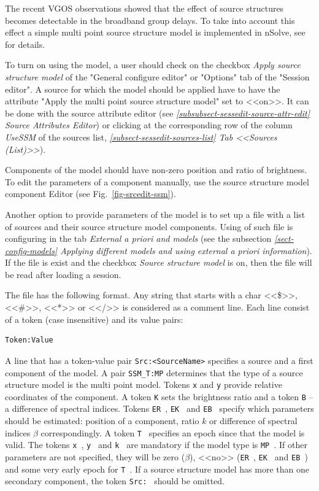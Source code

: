 \documentclass [10pt,letterpaper]{report}
\newcommand{\nuSolve}{\greektext n\latintext Solve}
\begin{document}
The recent VGOS observations showed that the effect of source structures becomes
detectable in the broadband group delays. To take into account this effect
a simple multi point source structure model is implemented in \nuSolve{}, see
\cite{Bolotin2019} for details.

To turn on using the model, a user should check on the checkbox {\sl Apply source
structure model} of the "General configure editor" or "Options" tab of the
"Session editor". A source for which the model should be applied have to have
the attribute "Apply the multi point source structure model" set to <<on>>.
It can be done with the source attribute editor (see
\emph{\ref{subsubsect-sessedit-source-attr-edit} Source Attributes Editor}) or
clicking at the corresponding row of the column {\sl UseSSM} of the sources list,
\emph{\ref{subsect-sessedit-sources-list} Tab <<Sources (List)>>}).

Components of the model should have non-zero position and ratio of brightness.
To edit the parameters of a component manually, use the source structure model
component Editor (see Fig.~\ref{fig-srcedit-ssm}).

Another option to provide parameters of the model is to set up a file with a
list of sources and their source structure model components. Using of such file
is configuring in the tab {\sl External a priori and models}
(see the subsection \emph{\ref{sect-config-models} Applying different models
and using external a priori information}). If the file is exist and the checkbox
{\sl Source structure model} is on, then the file will be read after loading a
session.

The file has the following format. Any string that starts with a char <<\$>>,
<<\#>>, <<*>> or <</>> is considered as a comment line. Each line consist of
a token (case insensitive) and its value pairs:
\begin{verbatim}
Token:Value
\end{verbatim}
\noindent
A line that has a token-value pair {\tt Src:<SourceName>} specifies a source
and a first component of the model. A pair {\tt SSM\_T:MP} determines that the type
of a source structure model is the multi point model. Tokens {\tt x} and {\tt y} provide
relative coordinates of the component. A token {\tt K} sets the brightness ratio
and a token {\tt B} -- a difference of spectral indices. Tokens
{\tt ER }, {\tt EK } and {\tt EB } specify which parameters should be estimated:
position of a component, ratio $k$ or difference of spectral indices $\beta$ correspondingly.
A token {\tt T } specifies an epoch since that the model is valid. The tokens
{\tt x }, {\tt y } and {\tt k } are mandatory if the model type is {\tt MP }.
If other parameters are not specified, they will be zero ($\beta$), <<no>> ({\tt ER },
{\tt EK } and {\tt EB }) and some very early epoch for {\tt T }.
If a source structure model has more than one secondary component, the token
{\tt Src: } should be omitted.
\end{document}
